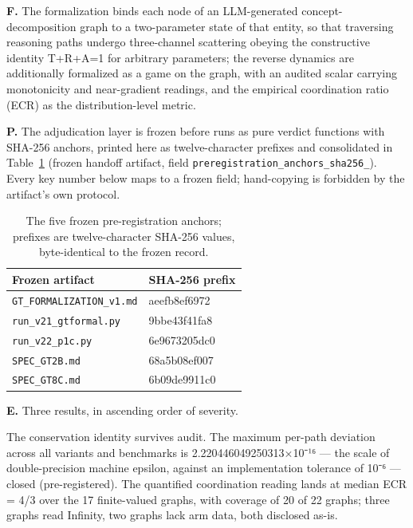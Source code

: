 \documentclass[11pt,a4paper]{article}
\begin{document}
\textbf{F.} The formalization binds each node of an LLM-generated concept-decomposition graph to a two-parameter state of that entity, so that traversing reasoning paths undergo three-channel scattering obeying the constructive identity T+R+A=1 for arbitrary parameters; the reverse dynamics are additionally formalized as a game on the graph, with an audited scalar carrying monotonicity and near-gradient readings, and the empirical coordination ratio (ECR) as the distribution-level metric.

\textbf{P.} The adjudication layer is frozen before runs as pure verdict functions with SHA-256 anchors, printed here as twelve-character prefixes and consolidated in Table~\ref{tab:anchors} (frozen handoff artifact, field \texttt{preregistration\_\allowbreak anchors\_\allowbreak sha256\_}). Every key number below maps to a frozen field; hand-copying is forbidden by the artifact's own protocol.

\begin{table}[htbp]
\centering
\small
\setlength{\tabcolsep}{5pt}
\renewcommand{\arraystretch}{1.18}
\begin{tabularx}{0.88\textwidth}{@{}>{\raggedright\arraybackslash}X l@{}}
\toprule
\textbf{Frozen artifact} & \textbf{SHA-256 prefix} \\
\midrule
\texttt{GT\_\allowbreak FORMALIZATION\_\allowbreak v1.md} & aeefb8ef6972 \\
\texttt{run\_\allowbreak v21\_\allowbreak gtformal.py} & 9bbe43f41fa8 \\
\texttt{run\_\allowbreak v22\_\allowbreak p1c.py} & 6e9673205dc0 \\
\texttt{SPEC\_\allowbreak GT2B.md} & 68a5b08ef007 \\
\texttt{SPEC\_\allowbreak GT8C.md} & 6b09de9911c0 \\
\bottomrule
\end{tabularx}
\caption{The five frozen pre-registration anchors; prefixes are twelve-character SHA-256 values, byte-identical to the frozen record.}
\label{tab:anchors}
\end{table}

\textbf{E.} Three results, in ascending order of severity.

The conservation identity survives audit. The maximum per-path deviation across all variants and benchmarks is 2.220446049250313×10⁻¹⁶ — the scale of double-precision machine epsilon, against an implementation tolerance of 10⁻⁶ — closed (pre-registered). The quantified coordination reading lands at median ECR = 4/3 over the 17 finite-valued graphs, with coverage of 20 of 22 graphs; three graphs read Infinity, two graphs lack arm data, both disclosed as-is.
\end{document}
